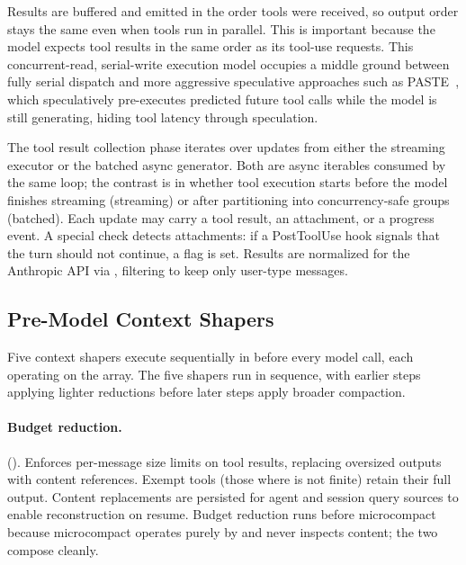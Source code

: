 Results are buffered and emitted in the order tools were received, so output order stays the same even when tools run in parallel. This is important because the model expects tool results in the same order as its tool-use requests. This concurrent-read, serial-write execution model occupies a middle ground between fully serial dispatch and more aggressive speculative approaches such as PASTE~\citep{sui2026paste}, which speculatively pre-executes predicted future tool calls while the model is still generating, hiding tool latency through speculation.

The tool result collection phase iterates over updates from either the streaming executor or the batched  async generator. Both are async iterables consumed by the same  loop; the contrast is in whether tool execution starts before the model finishes streaming (streaming) or after partitioning into concurrency-safe groups (batched). Each update may carry a tool result, an attachment, or a progress event. A special check detects  attachments: if a PostToolUse hook signals that the turn should not continue, a  flag is set. Results are normalized for the Anthropic API via , filtering to keep only user-type messages.

\subsection{Pre-Model Context Shapers}
\label{sec:turn:shapers}

Five context shapers execute sequentially in  before every model call, each operating on the  array. The five shapers run in sequence, with earlier steps applying lighter reductions before later steps apply broader compaction.

\paragraph{Budget reduction.} ().
Enforces per-message size limits on tool results, replacing oversized outputs with content references. Exempt tools (those where  is not finite) retain their full output. Content replacements are persisted for agent and session query sources to enable reconstruction on resume. Budget reduction runs before microcompact because microcompact operates purely by  and never inspects content; the two compose cleanly.

